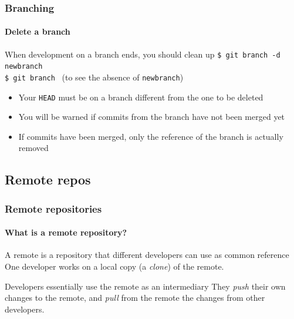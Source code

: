 \begin{frame}
\frametitle{Branching}
\framesubtitle{Delete a branch}

\begin{block}{When development on a branch ends, you should clean up}
\texttt{\$ git branch -d newbranch} \\
\texttt{\$ git branch} \,\,\,(to see the absence of \texttt{newbranch})

\medskip
\begin{itemize}
\item Your \texttt{HEAD} must be on a branch different from the one to be deleted
\item You will be warned if commits from the branch have not been merged yet
\item If commits have been merged, only the reference of the branch is actually removed
\end{itemize}
\end{block}

\end{frame}

\subsection{Remote repos}

\begin{frame}
\frametitle{Remote repositories}
\framesubtitle{What is a remote repository?}

\begin{block}{A remote is a repository that different developers can use as common reference}
One developer works on a local copy (a {\em clone}) of the remote.
\end{block}
\begin{block}{Developers essentially use the remote as an intermediary}
They {\em push} their own changes to the remote, and {\em pull} from the remote the changes from other developers.
\end{block}

\end{frame}

